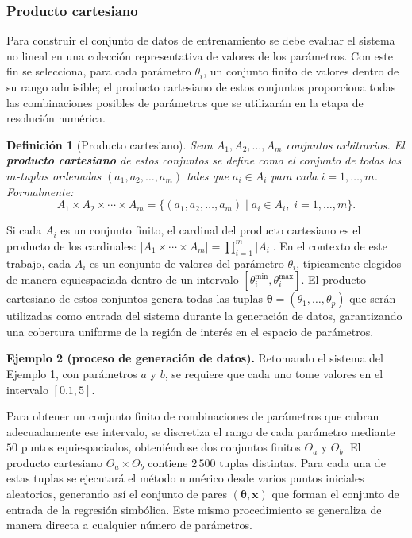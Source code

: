 \documentclass{article}
\newtheorem{definition}{Definición}
\newcommand{\xvec}{\mathbf{x}}
\newcommand{\thetavec}{\boldsymbol{\theta}}
\begin{document}
\subsubsection{Producto cartesiano}

Para construir el conjunto de datos de entrenamiento se debe evaluar el
sistema no lineal en una colección representativa de valores de los
parámetros. Con este fin se selecciona, para cada parámetro
\(\theta_i\), un conjunto finito de valores dentro de su rango
admisible; el producto cartesiano de estos conjuntos proporciona todas
las combinaciones posibles de parámetros que se utilizarán en la etapa
de resolución numérica.

\begin{definition}[Producto cartesiano]
Sean \(A_1, A_2, \dots, A_m\) conjuntos arbitrarios. El \textbf{producto
cartesiano} de estos conjuntos se define como el conjunto de todas las
\(m\)-tuplas ordenadas \((a_1, a_2, \dots, a_m)\) tales que
\(a_i \in A_i\) para cada \(i = 1, \dots, m\). Formalmente:
\begin{equation}
A_1 \times A_2 \times \cdots \times A_m =
    \{(a_1, a_2, \dots, a_m) \mid a_i \in A_i,\; i=1,\dots,m\}.
\end{equation}
\end{definition}

Si cada \(A_i\) es un conjunto finito, el cardinal del producto
cartesiano es el producto de los cardinales:
\(|A_1 \times \cdots \times A_m| = \prod_{i=1}^m |A_i|\). En el contexto
de este trabajo, cada \(A_i\) es un conjunto de valores del parámetro
\(\theta_i\), típicamente elegidos de manera equiespaciada dentro de un
intervalo \([\theta_i^{\min}, \theta_i^{\max}]\). El producto cartesiano
de estos conjuntos genera todas las tuplas
\(\thetavec = (\theta_1, \dots, \theta_p)\) que serán utilizadas como
entrada del sistema durante la generación de datos, garantizando una
cobertura uniforme de la región de interés en el espacio de parámetros.

\noindent\textbf{Ejemplo 2 (proceso de generación de datos).}
Retomando el sistema del Ejemplo 1, con parámetros \(a\) y \(b\), se
requiere que cada uno tome valores en el intervalo \([0.1, 5]\).

Para obtener un conjunto finito de combinaciones de parámetros que
cubran adecuadamente ese intervalo, se discretiza el rango de cada
parámetro mediante \(50\) puntos equiespaciados, obteniéndose dos
conjuntos finitos \(\Theta_a\) y \(\Theta_b\). El producto cartesiano
\(\Theta_a \times \Theta_b\) contiene \(2\,500\) tuplas distintas. Para
cada una de estas tuplas se ejecutará el método numérico desde varios
puntos iniciales aleatorios, generando así el conjunto de pares
\((\thetavec, \xvec)\) que forman el conjunto de entrada de la regresión
simbólica. Este mismo procedimiento se generaliza de manera directa a
cualquier número de parámetros.
\end{document}
